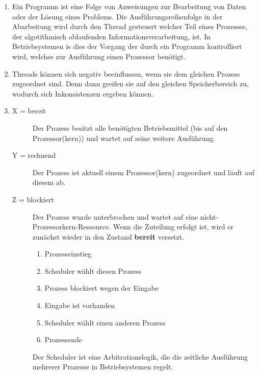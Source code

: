 \documentclass[ngerman]{fbi-aufgabenblatt}
\begin{document}
\begin{enumerate}
	\item Ein Programm ist eine Folge von Anweisungen zur Bearbeitung von Daten oder der Lösung eines Problems. Die Ausführungsreihenfolge in der Abarbeitung wird durch den Thread gesteuert welcher Teil eines Prozesses, der algotithmisch ablaufenden Informationsverarbeitung, ist. In Betriebsystemen is dies der Vorgang der durch ein Programm kontrolliert wird, welches zur Ausführung einen Prozessor benötigt.
	\item Threads können sich negativ beeinflussen, wenn sie dem gleichen Prozess zugeordnet sind. Denn dann greifen sie auf den gleichen Speicherbereich zu, wodurch sich Inkonsistenzen ergeben können.
	
	\newpage
	
	\setcounter{enumi}{3}
	\item 
	\begin{description} 
		\item[X = bereit] Der Prozess besitzt alle benötigten Betriebsmittel (bis auf den Prozessor(kern)) und wartet auf seine weitere Ausführung.
		\item[Y = rechnend] Der Prozess ist aktuell einem Prozessor(kern) zugeordnet und läuft auf diesem ab.
		\item[Z = blockiert] Der Prozess wurde unterbrochen und wartet auf eine nicht-Prozessorkern-Ressource. Wenn die Zuteilung erfolgt ist, wird er zunächst wieder in den Zustand \textbf{bereit} versetzt.
		\renewcommand{\theenumii}{\alph{enumii} =}
		\begin{enumerate}
   			\item Prozesseinstieg
   			\item Scheduler wählt diesen Prozess
   			\item Prozess blockiert wegen der Eingabe
   			\item Eingabe ist vorhanden
   			\item Scheduler wählt einen anderen Prozess
   			\item Prozessende
   		\end{enumerate}
	Der Scheduler ist eine Arbitrationslogik, die die zeitliche Ausführung mehrerer Prozesse in Betriebsystemen regelt.
	\end{description}
\end{enumerate}
%

\end{document}
